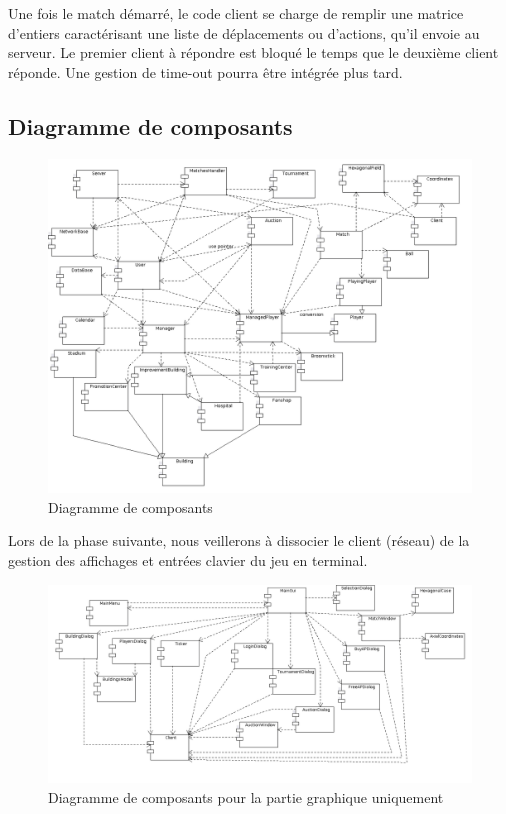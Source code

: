 \documentclass[a4paper,titlepage]{scrreprt}
\begin{document}
  Une fois le match démarré, le code client se charge de remplir une matrice d'entiers caractérisant
  une liste de déplacements ou d'actions, qu'il envoie au serveur. Le premier client à répondre
  est bloqué le temps que le deuxième client réponde. 
  Une gestion de time-out pourra être intégrée plus tard.

\subsection{Diagramme de composants}
      \begin{figure}[H]
    \center
    \includegraphics[scale=0.4]{uml/Diagrammededeploiement.png}
    \caption{Diagramme de composants}
    \end{figure}
    Lors de la phase suivante, nous veillerons à dissocier le client (réseau) de la gestion des affichages et entrées clavier du jeu en terminal.
    \begin{figure}[H]
    \center
    \includegraphics[scale=0.3]{uml/GUIComponents.png}
    \caption{Diagramme de composants pour la partie graphique uniquement}
    \end{figure}
\newpage
\end{document}
